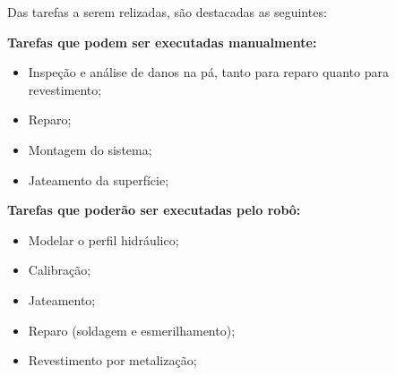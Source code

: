 Das tarefas a serem relizadas, são destacadas as seguintes:

\textbf{Tarefas que podem ser executadas manualmente:}
\begin{itemize}
  \item Inspeção e análise de danos na pá, tanto para reparo quanto para
  revestimento;
  \item Reparo;
  \item Montagem do sistema;
  \item Jateamento da superfície;
\end{itemize}

\textbf{Tarefas que poderão ser executadas pelo robô:}
\begin{itemize}
  \item Modelar o perfil hidráulico;
  \item Calibração;
  \item Jateamento;
  \item Reparo (soldagem e esmerilhamento);
  \item Revestimento por metalização;
\end{itemize}
